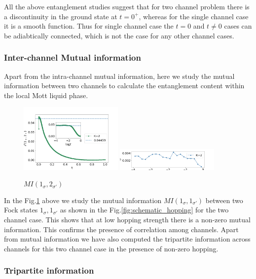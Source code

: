 \documentclass[reprint,prb,superscriptaddress]{revtex4-2}
\begin{document}
\par All the above  entanglement studies suggest that for two channel problem there is a discontinuity in the ground state at $t=0^{+}$, whereas for the single channel case it is a smooth function. Thus for single channel case the $t=0$ and $t\neq 0$ cases can be adiabtically connected, which is not the case for any other channel cases. 


\subsubsection{Inter-channel Mutual information}
Apart from the intra-channel mutual information, here we study the mutual information between two channels to calculate the entanglement content within the local Mott liquid phase.
\begin{figure}
\includegraphics[width=0.45\textwidth]{plt/A_I2_ch2_[1,3]}
\includegraphics[width=0.45\textwidth]{plt/errorbar_A_I2_ch2_[1,3]}
\caption{$MI(1_{\sigma},2_{\sigma'})$}
\label{fig:MI_1_2}
\end{figure}
In the Fig.\ref{fig:MI_1_2} above we study the mutual information $MI(1_{\sigma},1_{\sigma'})$ between two Fock states $1_{\sigma},1_{\sigma'}$ as shown in the Fig.\ref{fig:schematic_hopping} for the two channel case. This shows that at low hopping strength there is a non-zero mutual information. This confirms the presence of correlation among channels. Apart from mutual information we have also computed the tripartite information across channels for this two channel case in the presence of non-zero hopping.
\subsubsection{Tripartite information}
\end{document}
